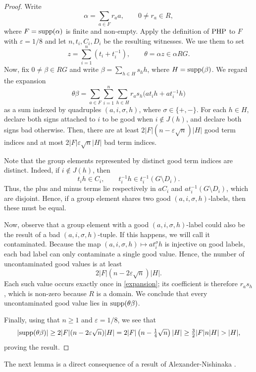 \documentclass[11pt]{article}
\theoremstyle{definition}
\theoremstyle{remark}
\numberwithin{equation}{section}
\numberwithin{equation}{section}
\numberwithin{equation}{section}
\begin{document}
\begin{proof}
Write
$$
    \alpha=\sum_{a\in F}r_a a,\qquad 0\neq r_a\in R,
$$
where $F={\rm supp}(\alpha)$ is finite and non-empty. Apply the definition of ${\rm {PHP}}$ to $F$ with $\varepsilon=1/8$ and let $n,t_i,C_i,D_i$ be the resulting witnesses. We use them to set
$$
 z=\sum_{i=1}^n(t_i+t_i^{-1}),
 \qquad \theta=\alpha z\in\alpha RG.
$$
Now, fix $0\neq\beta\in RG$ and write $\beta=\sum_{h\in H}s_hh$, where $H={\rm supp}(\beta)$.  We regard the expansion
\begin{equation}\label{expansion}
    \theta\beta=\sum_{a\in F}\sum_{i=1}^n\sum_{h\in H} r_as_h\bigl(at_ih+at_i^{-1}h\bigr)
\end{equation}
as a sum indexed by quadruples $(a,i,\sigma,h)$, where $\sigma\in\{+,-\}$. For each $h\in H$, declare both signs attached to $i$ to be good when $i\notin J(h)$, and declare both signs bad otherwise. Then, there are at least $2|F|(n-\varepsilon\sqrt n)|H|$ good term indices and at most $2|F|\varepsilon\sqrt n|H|$ bad term indices.

Note that the group elements represented by distinct good term indices are
distinct. Indeed, if $i\notin J(h)$, then
$$
 t_ih\in C_i,\qquad t_i^{-1}h\in t_i^{-1}( G\setminus D_i).
$$
Thus, the plus and minus terms lie respectively in $aC_i$ and $at_i^{-1}( G\setminus D_i)$, which are disjoint. Hence, if a group element shares two good $(a,i,\sigma,h)$-labels, then these must be equal. 

Now, observe that a group element with a good $(a,i,\sigma,h)$-label could also be the result of a bad $(a,i,\sigma,h)$-tuple. If this happens, we will call it contaminated. Because the map $(a,i,\sigma,h)\mapsto at_i^\sigma h$ is injective on good labels, each bad label can only contaminate a single good value. Hence, the number of uncontaminated good values is at least
$$
 2|F|(n-2\varepsilon\sqrt n)|H|.
$$
Each such value occurs exactly once in \eqref{expansion}; its coefficient is therefore $r_as_h$, which is non-zero because $R$ is a domain. We conclude that every uncontaminated good value lies in ${\rm supp}(\theta\beta)$.

Finally, using that $n\geq1$ and $\varepsilon=1/8$, we see that
$$
 |{\rm supp}(\theta\beta)|\geq 2|F|(n-2\varepsilon\sqrt n)|H|=2|F|\left(n-\tfrac14\sqrt n\right)|H| \geq\tfrac32|F|n|H|>|H|,
$$
proving the result.
\end{proof}

The next lemma is a direct consequence of a result of Alexander-Nishinaka \cite{AlNi17}.
\end{document}
